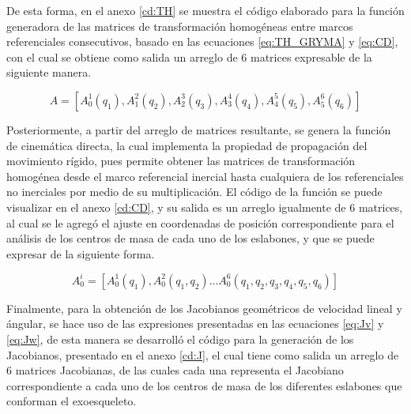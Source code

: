     De esta forma, en el anexo \ref{cd:TH} se muestra el código elaborado para la función generadora de 
    las matrices de transformación homogéneas entre marcos referenciales consecutivos, basado 
    en las ecuaciones \ref{eq:TH_GRYMA} y \ref{eq:CD}, con el cual se obtiene como salida un arreglo de 6 matrices 
    expresable de la siguiente manera.

    \begin{equation*}
        A = [A^1_0(q_1), A^2_1(q_2), A^3_2(q_3), A^4_3(q_4), A^5_4(q_5), A^6_5(q_6)]
    \end{equation*}

    Posteriormente, a partir del arreglo de matrices resultante, se genera la función 
    de cinemática directa, la cual implementa la propiedad de propagación del movimiento 
    rígido, pues permite obtener las matrices de transformación homogénea desde el marco 
    referencial inercial hasta cualquiera de los referenciales no inerciales por medio de su multiplicación. 
    El código de la función se puede visualizar en el anexo \ref{cd:CD}, y su salida es un arreglo igualmente de 
    6 matrices, al cual se le agregó el ajuste en coordenadas de posición correspondiente para 
    el análisis de los centros de masa de cada uno de los eslabones, y que se puede expresar 
    de la siguiente forma.

    \begin{equation*}
        A^i_0 = [A^1_0(q_1), A^2_0(q_1,q_2)...A^6_0(q_1,q_2,q_3,q_4,q_5,q_6)]
    \end{equation*}

    Finalmente, para la obtención de los Jacobianos geométricos de velocidad lineal y ángular, 
    se hace uso de las expresiones presentadas en las ecuaciones \ref{eq:Jv} y \ref{eq:Jw}, de 
    esta manera se desarrolló el código para la generación de los Jacobianos, presentado en el 
    anexo \ref{cd:J}, el cual tiene como salida un arreglo de 6 matrices Jacobianas, de las cuales cada una 
    representa el Jacobiano correspondiente a cada uno de los centros de masa de los diferentes eslabones 
    que conforman el exoesqueleto.


